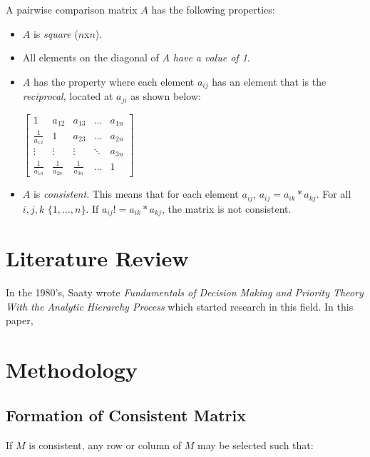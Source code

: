 \documentclass[12pt]{amsart}
\theoremstyle{definition}
\begin{document}
A pairwise comparison matrix $A$ has the following properties:
\begin{itemize}
\item $A$ is \textit{square} ($n$x$n$).
\item All elements on the diagonal of $A$ \textit{have a value of 1}.
\item $A$ has the property where each element $a_{ij}$ has an element that is the \textit{reciprocal}, located at $a_{ji}$ as shown below:

\begin{center}


$
\begin{bmatrix}
    1 & a_{12} & a_{13} & \dots  & a_{1n} \\
    \frac{1}{a_{12}} & 1 & a_{23} & \dots  & a_{2n} \\
    \vdots & \vdots & \vdots & \ddots & a_{3n} \\
    \frac{1}{a_{1n}} & \frac{1}{a_{2n}} & \frac{1}{a_{3n}} & \dots  & 1
\end{bmatrix}
$





\end{center}



\item $A$ is \textit{consistent}.  This means that for each element $a_{ij}$, $a_{ij}=a_{ik}*a_{kj}$.  For all $i,j,k$ $\{1,\dots,n\}$. If $a_{ij}!=a_{ik}*a_{kj}$, the matrix is not consistent.
\end{itemize}

\cite{saaty2000fundamentals}



\section{Literature Review}
In the 1980's, Saaty \cite{saaty2000fundamentals} wrote \textit{Fundamentals of Decision Making and Priority Theory With the Analytic Hierarchy Process} which started research in this field.  In this paper, 

\section{Methodology}

\subsection{Formation of Consistent Matrix}
If $M$ is consistent, any row or column of $M$ may be selected such that:
\end{document}
